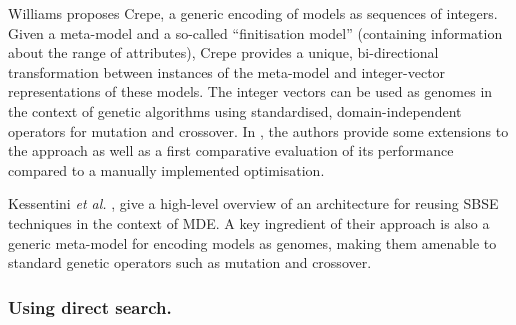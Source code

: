 			Williams \cite{Williams13} proposes Crepe, a generic encoding of models as sequences of integers. Given a meta-model and a so-called ``finitisation model'' 
			(containing information about the range of attributes), Crepe provides a unique, bi-directional transformation between instances of the meta-model and
			integer-vector representations of these models. The integer vectors can be used as genomes in the context of genetic algorithms using standardised, 
			domain-independent operators for mutation and crossover. In \cite{Efstathiou+14b}, the authors provide some extensions to the approach as well as a first
			comparative evaluation of its performance compared to a manually implemented optimisation.
			
			Kessentini \emph{et al.} \cite{Kessentini+13}, give a high-level overview of an architecture for reusing SBSE techniques in the context of MDE. A key
			ingredient of their approach is also a generic meta-model for encoding models as genomes, making them amenable to standard genetic operators such as
			mutation and crossover.

	  \subsubsection{Using direct search.}

			
